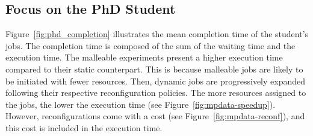 \documentclass[a4paper,fleqn]{cas-dc}
\begin{document}
\subsection{Focus on the PhD Student}
Figure~\ref{fig:phd_completion} illustrates the mean completion time of the student's jobs.
The completion time is composed of the sum of the waiting time and the execution time. 
The malleable experiments present a higher execution time compared to their static counterpart.
This is because malleable jobs are likely to be initiated with fewer resources.
Then, dynamic jobs are progressively expanded following their respective reconfiguration policies.
The more resources assigned to the jobs, the lower the execution time (see Figure~\ref{fig:mpdata-speedup}). 
However, reconfigurations come with a cost (see Figure~\ref{fig:mpdata-reconf}), and this cost is included in the execution time.
\end{document}

